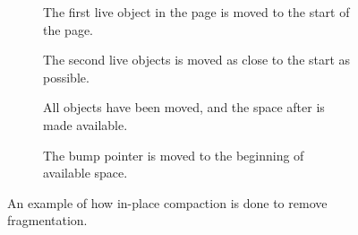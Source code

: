 \begin{figure}[H]
    \centering
    \begin{subfigure}[t]{.2\textwidth}
        \centering
        
        \caption{The first live object in the page is moved to the start of the page.}
        \label{fig:zrel_in1}
    \end{subfigure}
    \hfill\vline\hfill
    \begin{subfigure}[t]{.2\textwidth}
        \centering
        
        \caption{The second live objects is moved as close to the start as possible.}
        \label{fig:zrel_in1}
    \end{subfigure}
    \hfill\vline\hfill
    \begin{subfigure}[t]{.2\textwidth}
        \centering
        
        \caption{All objects have been moved, and the space after is made available.}
        \label{fig:zrel_in1}
    \end{subfigure}
    \hfill\vline\hfill
    \begin{subfigure}[t]{.2\textwidth}
        \centering
        
        \caption{The bump pointer is moved to the beginning of available space.}
        \label{fig:zrel_in1}
    \end{subfigure}
    \caption{An example of how in-place compaction is done to remove fragmentation.}
    \label{fig:zrel_in}
\end{figure}
 
